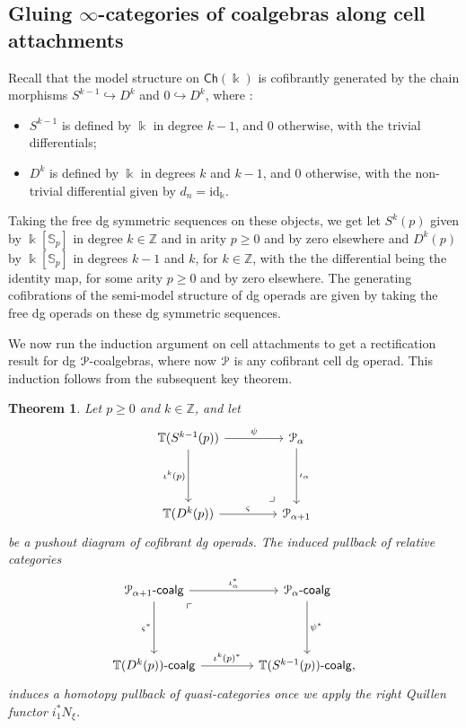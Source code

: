 \documentclass[a4paper,12pt]{amsart}
\renewcommand{\mathcal}{\EuScript}
\newcommand{\oneop}{\mathcal{P}}
\newcommand{\onecoalg}[1]{#1\text{-}\mathsf{coalg}}
\theoremstyle{plain}
\newtheorem{theorem}{Theorem}[section]
\theoremstyle{definition}
\theoremstyle{remark}
\newcommand{\kk}{\Bbbk}
\begin{document}
\subsection{Gluing $\infty$-categories of coalgebras along cell attachments}
Recall that the model structure on $\mathsf{Ch}(\kk)$ is cofibrantly generated by the chain morphisms $S^{k-1}\hookrightarrow D^k$ and $0\hookrightarrow D^k$, where :
\begin{itemize}
    \item $S^{k-1}$ is defined by $\kk$ in degree $k-1$, and $0$ otherwise, with the trivial differentials;
    \item $D^k$ is defined by $\kk$ in degrees $k$ and $k-1$, and $0$ otherwise, with the non-trivial differential given by $d_n= \mathrm{id}_\kk$.
\end{itemize}

Taking the free dg symmetric sequences on these objects, we get let $S^{k}(p)$ given by $\kk[\mathbb{S}_p]$ in degree $k \in \mathbb{Z}$ and in arity $p \geq 0$ and by zero elsewhere and $D^k(p)$ by $\kk[\mathbb{S}_p]$ in degrees $k-1$ and $k$, for $k \in \mathbb{Z}$, with the the differential being the identity map, for some arity $p \geq 0$ and by zero elsewhere. The generating cofibrations of the semi-model structure of dg operads are given by taking the free dg operads on these dg symmetric sequences.

We now run the induction argument on cell attachments to get a rectification result for dg $\mathcal{P}$-coalgebras, where now $\mathcal{P}$ is any cofibrant cell dg operad. This induction follows from the subsequent key theorem.

\begin{theorem}\label{thm: key theorem}
Let $p \geq 0$ and $k \in \mathbb{Z}$, and let 
\[
\begin{tikzcd}[column sep=3.5pc,row sep=3.5pc]
\mathbb{T}(S^{k-1}(p)) \arrow[r,"\psi"] \arrow[d,"\iota^k(p)",swap]  \arrow[dr, phantom,"\ulcorner" rotate=-180, very near end]
&\oneop_\alpha \arrow[d,"\iota_\alpha"]  \\
\mathbb{T}(D^k(p)) \arrow[r,"\varsigma"]
&\oneop_{\alpha + 1}
\end{tikzcd}
\]
be a pushout diagram of cofibrant dg operads. The induced pullback of \emph{relative} categories
\[
\begin{tikzcd}[column sep=3.5pc,row sep=3.5pc]
\onecoalg{\oneop_{\alpha + 1}} \arrow[r,"\iota_\alpha^*"] \arrow[d,"\varsigma^*",swap] \arrow[dr, phantom, "\ulcorner", very near start]
&\onecoalg{\oneop_\alpha}\arrow[d,"\psi^*"]  \\
\onecoalg{\mathbb{T}(D^k(p))} \arrow[r,"\iota^k(p)^*"]
&\onecoalg{\mathbb{T}(S^{k-1}(p))},
\end{tikzcd}
\]
induces a \emph{homotopy pullback} of quasi-categories once we apply the right Quillen functor $i_1^*N_{\xi}$.
\end{theorem}
\end{document}
